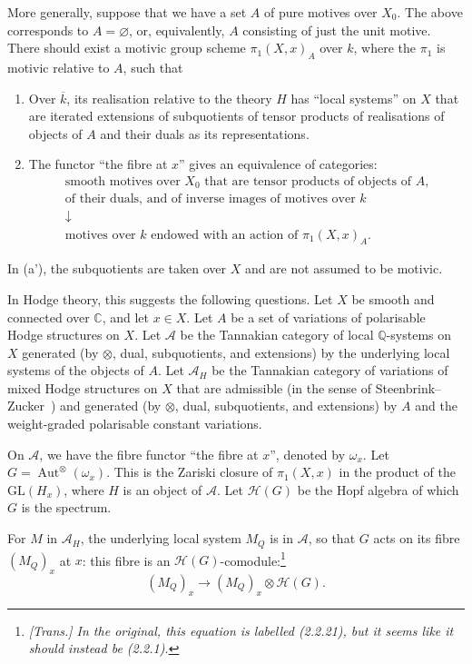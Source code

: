 \documentclass{article}
\theoremstyle{plain}
\theoremstyle{definition}
\newcommand{\sh}[1]{{\mathscr{#1}}}
\newcommand{\QQ}{\mathbb{Q}}
\newcommand{\CC}{\mathbb{C}}
\newcommand{\GL}{\mathrm{GL}}
\DeclareMathOperator{\Aut}{Aut}
\newcommand{\oldpage}[1]{\marginpar{\footnotesize$\Big\vert$ \textit{p.~#1}}}
\begin{document}
More generally, suppose that we have a set $A$ of pure motives over $X_0$.
The above corresponds to $A=\varnothing$, or, equivalently, $A$ consisting of just the unit motive.
There should exist a motivic group scheme $\pi_1(X,x)_A$ over $k$, where the $\pi_1$ is motivic relative to $A$, such that
\begin{enumerate}[(a')]
  \item Over $\overline{k}$, its realisation relative to the theory $H$ has ``local systems'' on $X$ that are iterated extensions of subquotients of tensor products of realisations of objects of $A$ and their duals as its representations.
  \item The functor ``the fibre at $x$'' gives an equivalence of categories:
    \[
      \begin{gathered}
        \mbox{smooth motives over $X_0$ that are tensor products of objects of $A$,}
      \\\mbox{of their duals, and of inverse images of motives over $k$}
      \\\downarrow
      \\\mbox{motives over $k$ endowed with an action of $\pi_1(X,x)_A$.}
      \end{gathered}
    \]
\end{enumerate}

In (a'), the subquotients are taken over $X$ and are not assumed to be motivic.

In Hodge theory, this suggests the following questions.
Let $X$ be smooth and connected over $\CC$, and let $x\in X$.
Let $A$ be a set of variations of polarisable Hodge structures on $X$.
Let $\sh{A}$ be the Tannakian category of local $\QQ$-systems on $X$ generated (by $\otimes$, dual, subquotients, and extensions) by the underlying local systems of the objects of $A$.
Let $\sh{A}_H$ be the Tannakian category of variations of mixed Hodge structures on $X$ that are admissible (in the sense of Steenbrink--Zucker~\cite{30}) and generated (by $\otimes$, dual, subquotients, and extensions) by $A$ and the weight-graded polarisable constant variations.

On $\sh{A}$, we have the fibre functor ``the fibre at $x$'', denoted by $\omega_x$.
Let $G=\Aut^\otimes(\omega_x)$.
This is the Zariski closure of $\pi_1(X,x)$ in the product of the $\GL(H_x)$, where $H$ is an object of $\sh{A}$.
Let $\sh{H}(G)$ be the Hopf algebra of which $G$ is the spectrum.

\oldpage{154}
For $M$ in $\sh{A}_H$, the underlying local system $M_Q$ is in $\sh{A}$, so that $G$ acts on its fibre $(M_Q)_x$ at $x$: this fibre is an $\sh{H}(G)$-comodule:\footnote{\emph{[Trans.] In the original, this equation is labelled (2.2.21), but it seems like it should instead be (2.2.1).}}
\[
\label{2.2.1}
  (M_Q)_x \to (M_Q)_x\otimes\sh{H}(G).
\tag{2.2.1}
\]
\end{document}
